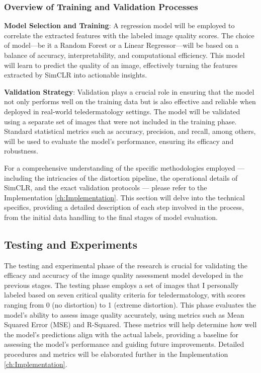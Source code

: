 \subsubsection{Overview of Training and Validation Processes}
\label{subsub:OverciewTrainVal}
\textbf{Model Selection and Training}: A regression model will be employed to correlate the extracted features with the labeled image quality scores. The choice of model—be it a Random Forest or a Linear Regressor—will be based on a balance of accuracy, interpretability, and computational efficiency. This model will learn to predict the quality of an image, effectively turning the features extracted by SimCLR into actionable insights. \par 
\noindent
\textbf{Validation Strategy}: Validation plays a crucial role in ensuring that the model not only performs well on the training data but is also effective and reliable when deployed in real-world teledermatology settings. The model will be validated using a separate set of images that were not included in the training phase. Standard statistical metrics such as accuracy, precision, and recall, among others, will be used to evaluate the model’s performance, ensuring its efficacy and robustness.\par
\vspace{\baselineskip}
\noindent
For a comprehensive understanding of the specific methodologies employed — including the intricacies of the distortion pipeline, the operational details of SimCLR, and the exact validation protocols — please refer to the Implementation \autoref{ch:Implementation}. This section will delve into the technical specifics, providing a detailed description of each step involved in the process, from the initial data handling to the final stages of model evaluation. \par 


\subsection{Testing and Experiments}
\label{sub:TestExperiment}
The testing and experimental phase of the research is crucial for validating the efficacy and accuracy of the image quality assessment model developed in the previous stages. The testing phase employs a set of images that I personally labeled based on seven critical quality criteria for teledermatology, with scores ranging from 0 (no distortion) to 1 (extreme distortion). This phase evaluates the model’s ability to assess image quality accurately, using metrics such as Mean Squared Error (MSE) and R-Squared. These metrics will help determine how well the model's predictions align with the actual labels, providing a baseline for assessing the model’s performance and guiding future improvements. Detailed procedures and metrics will be elaborated further in the Implementation \autoref{ch:Implementation}.\par 

